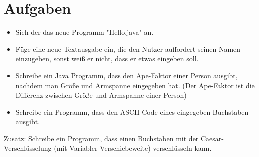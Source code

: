 \section {Aufgaben}
\begin{itemize}
\item Sieh der das neue Programm "Hello.java" an.
\item Füge eine neue Textausgabe ein, die den Nutzer auffordert seinen Namen einzugeben, sonst weiß er nicht, dass er etwas eingeben soll.
\item Schreibe ein Java Programm, dass den Ape-Faktor einer Person ausgibt, nachdem man Größe und Armspanne eingegeben hat. (Der Ape-Faktor ist die Differenz zwischen Größe und Armspanne einer Person)
\item Schreibe ein Programm, dass den ASCII-Code eines eingegeben Buchstaben ausgibt.
\end{itemize}

Zusatz: Schreibe ein Programm, dass einen Buchstaben mit der Caesar-Verschlüsselung (mit Variabler Verschiebeweite) verschlüsseln kann.
